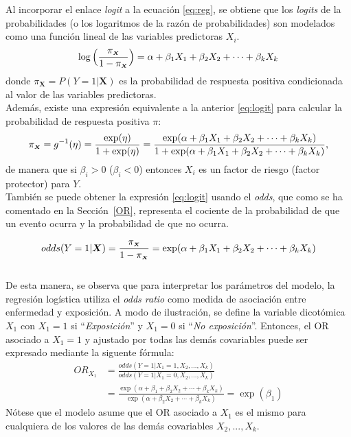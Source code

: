 Al incorporar el enlace \textit{logit} a la ecuación \eqref{eq:reg}, se obtiene que los \textit{logits} de la probabilidades (o los logaritmos de la razón de probabilidades) son modelados como una función lineal de las variables predictoras $X_i$.
\begin{equation}
\label{eq:logit}
 \log \Big( \frac{\pi_{\mathsmaller{\boldsymbol{X}}}}{1-\pi_{\mathsmaller{\boldsymbol{X}}}} \Big)= \alpha + \beta_1X_1 + \beta_2X_2 + \cdots + \beta_kX_k
\end{equation}
donde $\pi_{\boldsymbol{X}}=P(Y=1|\boldsymbol{X})$ es la probabilidad de respuesta positiva condicionada al valor de las variables predictoras. \\

Además, existe una expresión equivalente a la anterior \eqref{eq:logit} para calcular la probabilidad de respuesta positiva $\pi$:
\begin{equation*}
\pi_{\mathsmaller{\boldsymbol{X}}}=g^{-1}(\eta)=\frac{\exp(\eta)}{1+\exp(\eta)}=\frac{\exp(\alpha + \beta_1X_1 + \beta_2X_2 + \cdots + \beta_kX_k)}{1+\exp(\alpha + \beta_1X_1 + \beta_2X_2 + \cdots + \beta_kX_k)},
\end{equation*}
 de manera que si $\beta_i>0$ ($\beta_i<0$) entonces $X_i$ es un factor de riesgo (factor protector) para $Y$. \\

También se puede obtener la expresión \eqref{eq:logit} usando el \textit{odds}, que como se ha comentado en la Sección~\ref{OR}, representa el cociente de la probabilidad de que un evento ocurra y la probabilidad de que no ocurra.

\begin{equation*}
odds(Y=1|\boldsymbol{X})=\frac{\pi_{\mathsmaller{\boldsymbol{X}}}}{1-\pi_{\mathsmaller{\boldsymbol{X}}}} = \exp(\alpha + \beta_1X_1 + \beta_2X_2 + \cdots+ \beta_kX_k)
\end{equation*}
 \\
De esta manera, se observa que para interpretar los parámetros del modelo, la regresión logística utiliza el \textit{odds ratio} como medida de asociación entre enfermedad y exposición. A modo de ilustración, se define la variable dicotómica $X_1$ con $X_1=1$ si ``\textit{Exposición}'' y $X_1=0$ si ``\textit{No exposición}''. Entonces, el OR asociado a $X_1=1$ y ajustado por todas las demás covariables puede ser expresado mediante la siguente fórmula:
\begin{align*}
OR_{X_1}
&= \frac{odds(Y=1|X_1=1, X_2,... , X_k)}{odds(Y=1|X_1=0, X_2,... , X_k)} \\[1.2ex]
&= \frac{\exp(\alpha + \beta_1 + \beta_2X_2 + \cdots + \beta_kX_k)}{\exp(\alpha + \beta_2X_2 + \cdots + \beta_kX_k)}  = \exp(\beta_1)
\end{align*}
Nótese que el modelo asume que el OR asociado a $X_1$ es el mismo para cualquiera de los valores de las demás covariables $X_2,...,X_k$.\\

